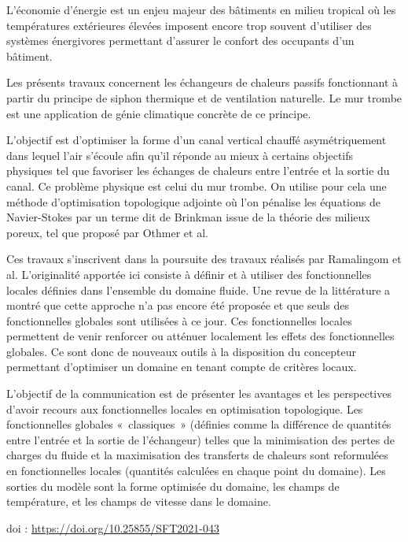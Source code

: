 {\normalsize
L'économie d'énergie est un enjeu majeur des bâtiments en milieu tropical où les températures extérieures élevées imposent encore trop souvent d'utiliser des systèmes énergivores permettant d'assurer le confort des occupants d'un bâtiment.



Les présents travaux concernent les échangeurs de chaleurs passifs fonctionnant à partir du principe de siphon thermique et de ventilation naturelle. Le mur trombe est une application de génie climatique concrète de ce principe.



L'objectif est d'optimiser la forme d'un canal vertical chauffé asymétriquement dans lequel l'air s'écoule afin qu'il réponde au mieux à certains objectifs physiques tel que favoriser les échanges de chaleurs entre l'entrée et la sortie du canal. Ce problème physique est celui du mur trombe. On utilise pour cela une méthode d'optimisation topologique adjointe où l'on pénalise les équations de Navier-Stokes par un terme dit de Brinkman issue de la théorie des milieux poreux, tel que proposé par Othmer et al.



Ces travaux s'inscrivent dans la poursuite des travaux réalisés par Ramalingom et al. L'originalité apportée ici consiste à définir et à utiliser des fonctionnelles locales définies dans l'ensemble du domaine fluide. Une revue de la littérature a montré que cette approche n'a pas encore été proposée et que seuls des fonctionnelles globales sont utilisées à ce jour. Ces fonctionnelles locales permettent de venir renforcer ou atténuer localement les effets des fonctionnelles globales. Ce sont donc de nouveaux outils à la disposition du concepteur permettant d'optimiser un domaine en tenant compte de critères locaux.



L'objectif de la communication est de présenter les avantages et les perspectives d'avoir recours aux fonctionnelles locales en optimisation topologique. Les fonctionnelles globales « classiques » (définies comme la différence de quantités entre l'entrée et la sortie de l'échangeur) telles que la minimisation des pertes de charges du fluide et la maximisation des transferts de chaleurs sont reformulées en fonctionnelles locales (quantités calculées en chaque point du domaine). Les sorties du modèle sont la forme optimisée du domaine, les champs de température, et les champs de vitesse dans le domaine.

 \vfill doi : \url{https://doi.org/10.25855/SFT2021-043}

}
 
